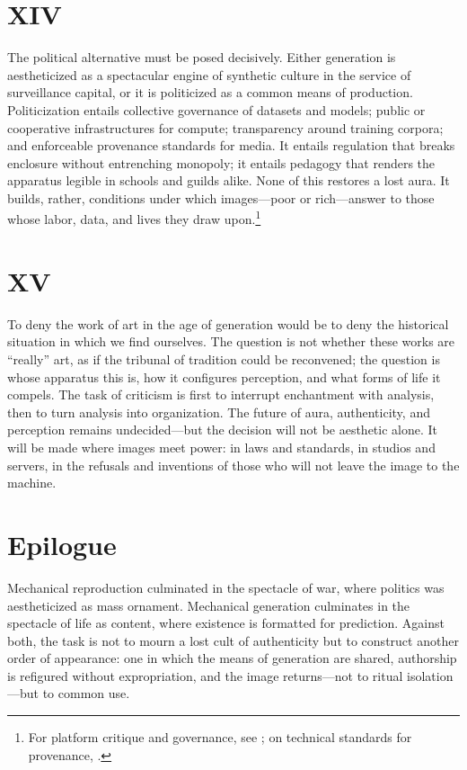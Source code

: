 \documentclass[12pt]{article}
\begin{document}
\section*{XIV}

The political alternative must be posed decisively. Either generation is aestheticized as a spectacular engine of synthetic culture in the service of surveillance capital, or it is politicized as a common means of production. Politicization entails collective governance of datasets and models; public or cooperative infrastructures for compute; transparency around training corpora; and enforceable provenance standards for media. It entails regulation that breaks enclosure without entrenching monopoly; it entails pedagogy that renders the apparatus legible in schools and guilds alike. None of this restores a lost aura. It builds, rather, conditions under which images---poor or rich---answer to those whose labor, data, and lives they draw upon.\footnote{For platform critique and governance, see \autocite{Srnicek2016}; on technical standards for provenance, \autocite{C2PA2023}.}

\section*{XV}

To deny the work of art in the age of generation would be to deny the historical situation in which we find ourselves. The question is not whether these works are ``really'' art, as if the tribunal of tradition could be reconvened; the question is whose apparatus this is, how it configures perception, and what forms of life it compels. The task of criticism is first to interrupt enchantment with analysis, then to turn analysis into organization. The future of aura, authenticity, and perception remains undecided---but the decision will not be aesthetic alone. It will be made where images meet power: in laws and standards, in studios and servers, in the refusals and inventions of those who will not leave the image to the machine.

\section*{Epilogue}

Mechanical reproduction culminated in the spectacle of war, where politics was aestheticized as mass ornament. Mechanical generation culminates in the spectacle of life as content, where existence is formatted for prediction. Against both, the task is not to mourn a lost cult of authenticity but to construct another order of appearance: one in which the means of generation are shared, authorship is refigured without expropriation, and the image returns---not to ritual isolation---but to common use.

\printbibliography
\end{document}
